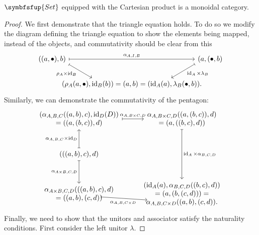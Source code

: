 \documentclass[fleqn]{NotesClass}
\makeatletter
\newcommand{\c@egory}[1]{\symbfsfup{#1}}
\newcommand{\Set}{\c@egory{Set}}
\DeclareMathOperator{\id}{id}
\makeatother
\begin{document}
    \begin{lma}{}{}
        \(\Set\) equipped with the Cartesian product is a monoidal category.
        
        \begin{proof}
            We first demonstrate that the triangle equation holds.
            To do so we modify the diagram defining the triangle equation to show the elements being mapped, instead of the objects, and commutativity should be clear from this
            \begin{equation}
                \begin{tikzcd}[column sep=-0.5cm]
                    ((a, \bullet), b) \arrow[rr, "\alpha_{A,I,B}", mapsto] \arrow[dr, "\rho_A \times \id_B"', end anchor={[xshift=-1cm]}, pos=0.4, mapsto] && (a, (\bullet, b) \arrow[dl, "\id_A \times \lambda_B", end anchor={[xshift=1cm]}, pos=0.4, mapsto]\\
                    & (\rho_A(a, \bullet), \id_B(b)) = (a, b) = (\id_A(a), \lambda_B(\bullet, b)). &
                \end{tikzcd}
            \end{equation}
            Similarly, we can demonstrate the commutativity of the pentagon:
            \begin{equation}
                \begin{tikzcd}[row sep=large]
                    \parbox{4cm}{\centering\((\alpha_{A,B,C}((a, b), c), \id_D(D))\) \(=((a, (b, c)), d)\)} \arrow[r, mapsto, "\alpha_{A, B\times C, D}"] & \parbox{3.5cm}{\centering\(\alpha_{A, B \times C, D}((a, (b, c)), d)\) \(=(a, ((b, c), d))\)} \arrow[dd, "\id_A \times \alpha_{B,C,D}", mapsto] \\
                    (((a, b), c), d) \arrow[u, "\alpha_{A,B,C} \times \id_D", mapsto] \arrow[d, "\alpha_{A\times B,C,D}"', mapsto]\\
                    \parbox{4cm}{\centering\(\alpha_{A\times B,C,D}(((a, b), c), d)\) \(=((a, b), (c, d))\)} \arrow[r, "\alpha_{A,B,C\times D}"', end anchor={[yshift=-2ex, xshift=1.2em]}, start anchor={[xshift=-3em, yshift=-1ex]}, mapsto, pos=0.8] & \parbox{4cm}{\centering\((\id_A(a), \alpha_{B,C,D}((b, c), d))\) \(= (a, (b, (c, d))) =\) \(\alpha_{A,B,C\times D}((a, b), (c, d))\).}
                \end{tikzcd}
            \end{equation}
            Finally, we need to show that the unitors and associator satisfy the naturality conditions.
            First consider the left unitor \(\lambda\).

\end{proof}
\end{lma}
\end{document}
